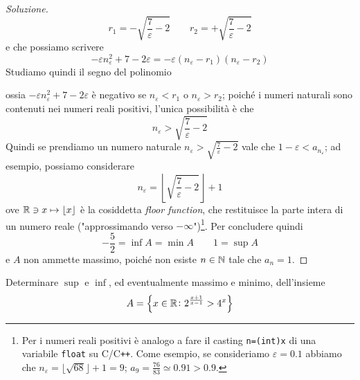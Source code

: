 \begin{proof}[Soluzione]
    \[
    r_1 = -\sqrt{\frac{7}{\varepsilon}-2} \qquad r_2 = +\sqrt{\frac{7}{\varepsilon}-2}
    \]
    e che possiamo scrivere
    \[
    -\varepsilon n_\varepsilon^2 +7-2\varepsilon = -\varepsilon(n_\varepsilon-r_1)(n_\varepsilon-r_2)
    \]
    Studiamo quindi il segno del polinomio
    \begin{center}
    \end{center}
    ossia $-\varepsilon n_\varepsilon^2+7-2\varepsilon$ è negativo se $n_\varepsilon <r_1$ o $n_\varepsilon> r_2$; poiché i numeri naturali sono contenuti nei numeri reali positivi, l'unica possibilità è che
    \[
    n_\varepsilon > \sqrt{\frac{7}{\varepsilon}-2}
    \]
    Quindi se prendiamo un numero naturale $n_\varepsilon > \sqrt{\frac{7}{\varepsilon}-2}$ vale che $1-\varepsilon <a_{n_\varepsilon}$; ad esempio, possiamo considerare
    \[
    n_\varepsilon = \left\lfloor\sqrt{\frac{7}{\varepsilon}-2}\right\rfloor+1
    \]
    ove $\amsbb{R}\ni x \mapsto \lfloor x \rfloor$ è la cosiddetta \emph{floor function}, che restituisce la parte intera di un numero reale ("approssimando verso $-\infty$")\footnote{Per i numeri reali positivi è analogo a fare il casting \texttt{n=(int)x} di una variabile \texttt{float} su C/C\texttt{++}. Come esempio, se consideriamo $\varepsilon=0.1$ abbiamo che $n_\varepsilon = \lfloor\sqrt{68}\rfloor+1 = 9$; $a_9 = \frac{76}{83}\simeq0.91>0.9$.}. Per concludere quindi
    \[
    -\frac{5}{2} = \inf A = \min A \qquad 1 = \sup A
    \]
    e $A$ non ammette massimo, poiché non esiste $n\in\amsbb{N}$ tale che $a_n = 1$.
\end{proof}
\begin{exercise}
    \label{ex:2.3}
    Determinare $\sup$ e $\inf$, ed eventualmente massimo e minimo, dell'insieme
    \[
    A = \left\{ x\in\amsbb{R} \colon 2^{\frac{x+1}{x-1}}>4^x\right\}
    \]
\end{exercise}
